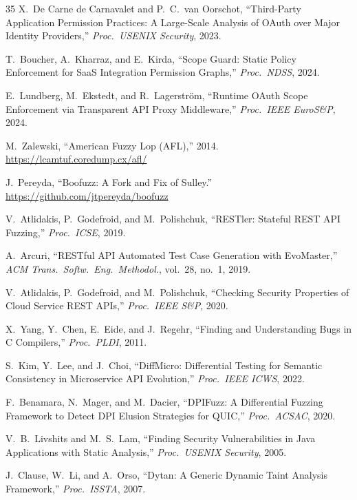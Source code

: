 \documentclass[12pt,a4paper]{report}
\begin{document}
\begin{thebibliography}{35}
X.\ De Carne de Carnavalet and P.\ C.\ van Oorschot, ``Third-Party Application Permission
Practices: A Large-Scale Analysis of OAuth over Major Identity Providers,''
\textit{Proc.\ USENIX Security}, 2023.

T.\ Boucher, A.\ Kharraz, and E.\ Kirda, ``Scope Guard: Static Policy Enforcement for SaaS
Integration Permission Graphs,'' \textit{Proc.\ NDSS}, 2024.

E.\ Lundberg, M.\ Ekstedt, and R.\ Lagerstr\"{o}m, ``Runtime OAuth Scope Enforcement via
Transparent API Proxy Middleware,'' \textit{Proc.\ IEEE EuroS\&P}, 2024.

M.\ Zalewski, ``American Fuzzy Lop (AFL),'' 2014.
\url{https://lcamtuf.coredump.cx/afl/}

J.\ Pereyda, ``Boofuzz: A Fork and Fix of Sulley.''
\url{https://github.com/jtpereyda/boofuzz}

V.\ Atlidakis, P.\ Godefroid, and M.\ Polishchuk, ``RESTler: Stateful REST API Fuzzing,''
\textit{Proc.\ ICSE}, 2019.

A.\ Arcuri, ``RESTful API Automated Test Case Generation with EvoMaster,''
\textit{ACM Trans.\ Softw.\ Eng.\ Methodol.}, vol.\ 28, no.\ 1, 2019.

V.\ Atlidakis, P.\ Godefroid, and M.\ Polishchuk, ``Checking Security Properties of Cloud
Service REST APIs,'' \textit{Proc.\ IEEE S\&P}, 2020.

X.\ Yang, Y.\ Chen, E.\ Eide, and J.\ Regehr, ``Finding and Understanding Bugs in C
Compilers,'' \textit{Proc.\ PLDI}, 2011.

S.\ Kim, Y.\ Lee, and J.\ Choi, ``DiffMicro: Differential Testing for Semantic Consistency
in Microservice API Evolution,'' \textit{Proc.\ IEEE ICWS}, 2022.

F.\ Benamara, N.\ Mager, and M.\ Dacier, ``DPIFuzz: A Differential Fuzzing Framework to
Detect DPI Elusion Strategies for QUIC,'' \textit{Proc.\ ACSAC}, 2020.

V.\ B.\ Livshits and M.\ S.\ Lam, ``Finding Security Vulnerabilities in Java Applications
with Static Analysis,'' \textit{Proc.\ USENIX Security}, 2005.

J.\ Clause, W.\ Li, and A.\ Orso, ``Dytan: A Generic Dynamic Taint Analysis Framework,''
\textit{Proc.\ ISSTA}, 2007.


\end{thebibliography}
\end{document}

